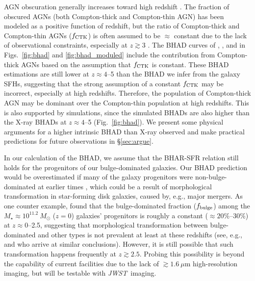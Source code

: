 \documentclass[twocolumn,twocolappendix,times]{aastex63}
\newcommand{\nustar}{{\it NuSTAR\/}}
\newcommand{\jwst}{{\it JWST\/}}
\newcommand{\xray}{\hbox{X-ray}}  %
\newcommand{\mstar}{M_{\star}} %
\newcommand{\fb}{f_{\rm bulge}}
\newcommand{\fctk}{f_{\rm CTK}}
\newcommand{\fst}[1]{#1}
\begin{document}
\begin{CJK*}{UTF8}{gbsn}
AGN obscuration generally increases toward high redshift \citep[e.g.,][]{hasinger08, liu17}. 
The fraction of obscured AGNs (both Compton-thick and Compton-thin AGN) has been modeled as a positive function of redshift, but the ratio of Compton-thick and Compton-thin AGNs ($\fctk$) is often assumed to be $\approx$ constant due to the lack of observational constraints, \fst{especially at $z\gtrsim 3$ \citep[e.g.,][]{ueda14, aird15, buchner15, ananna19}}. 
The BHAD curves of \cite{ueda14}, \cite{aird15}, and \cite{ananna19} in Figs.~\ref{fig:bhad} and \ref{fig:bhad_moduled} include the contribution from Compton-thick AGNs based on the assumption that $\fctk$ is constant. 
These BHAD estimations are still  lower at $z \approx 4$--5 than the BHAD we infer from the galaxy SFHs, suggesting that \fst{the strong assumption of a constant $\fctk$ may be incorrect, especially at high redshifts}. 
Therefore, the population of Compton-thick AGN may be dominant over the Compton-thin population at high redshifts.  
This is also supported by simulations, since the simulated BHADs are also higher than the X-ray BHADs at $z\approx 4$--5 (Fig.~\ref{fig:bhad}).
\fst{We present some physical arguments for a higher intrinsic BHAD than X-ray observed and make practical predictions for future observations in \S\ref{sec:argue}}.

In our calculation of the BHAD, we assume that the BHAR-SFR relation still holds 
for the progenitors of our bulge-dominated galaxies. 
Our BHAD prediction would be overestimated if many of the galaxy progenitors were non-bulge-dominated at earlier times \citep[e.g.,][]{kocevski17, ni21}, which could be a result of morphological transformation
in star-forming disk galaxies, caused by, e.g., major mergers. 
As one counter example, \cite{huertas_company15b} found that the bulge-dominated 
fraction ($\fb$) among the $\mstar \approx 10^{11.2}~M_\odot$ ($z=0$) 
galaxies' progenitors is roughly a constant ($\approx 20\%$--30\%) 
at $z\approx 0$--2.5, suggesting that morphological transformation 
between bulge-dominated and other types is not prevalent at least at these redshifts
(see, e.g., \citealt{mortlock13} and \citealt{conselice14}  
who arrive at similar conclusions).
However, it is still possible that such transformation happens
frequently at $z\gtrsim 2.5$. 
Probing this possibility is beyond the capability of 
current facilities due to the lack of $\gtrsim 1.6\ \mu$m high-resolution imaging, but will be testable with \jwst\ imaging. 


\end{CJK*}
\end{document}
